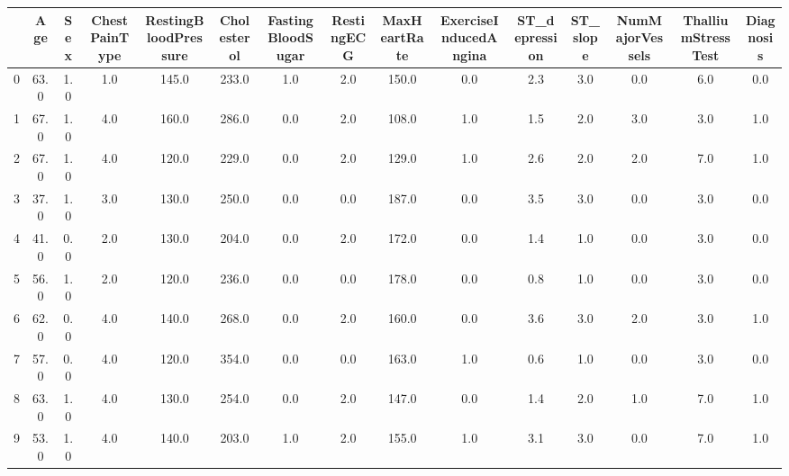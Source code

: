 \begin{tabular}{lcccccccccccccc}
\toprule
{} &   Age &  Sex &  ChestPainType &  RestingBloodPressure &  Cholesterol &  FastingBloodSugar &  RestingECG &  MaxHeartRate &  ExerciseInducedAngina &  ST\_depression &  ST\_slope &  NumMajorVessels &  ThalliumStressTest &  Diagnosis \\
\midrule
0 &  63.0 &  1.0 &            1.0 &                 145.0 &        233.0 &                1.0 &         2.0 &         150.0 &                    0.0 &            2.3 &       3.0 &              0.0 &                 6.0 &        0.0 \\
1 &  67.0 &  1.0 &            4.0 &                 160.0 &        286.0 &                0.0 &         2.0 &         108.0 &                    1.0 &            1.5 &       2.0 &              3.0 &                 3.0 &        1.0 \\
2 &  67.0 &  1.0 &            4.0 &                 120.0 &        229.0 &                0.0 &         2.0 &         129.0 &                    1.0 &            2.6 &       2.0 &              2.0 &                 7.0 &        1.0 \\
3 &  37.0 &  1.0 &            3.0 &                 130.0 &        250.0 &                0.0 &         0.0 &         187.0 &                    0.0 &            3.5 &       3.0 &              0.0 &                 3.0 &        0.0 \\
4 &  41.0 &  0.0 &            2.0 &                 130.0 &        204.0 &                0.0 &         2.0 &         172.0 &                    0.0 &            1.4 &       1.0 &              0.0 &                 3.0 &        0.0 \\
5 &  56.0 &  1.0 &            2.0 &                 120.0 &        236.0 &                0.0 &         0.0 &         178.0 &                    0.0 &            0.8 &       1.0 &              0.0 &                 3.0 &        0.0 \\
6 &  62.0 &  0.0 &            4.0 &                 140.0 &        268.0 &                0.0 &         2.0 &         160.0 &                    0.0 &            3.6 &       3.0 &              2.0 &                 3.0 &        1.0 \\
7 &  57.0 &  0.0 &            4.0 &                 120.0 &        354.0 &                0.0 &         0.0 &         163.0 &                    1.0 &            0.6 &       1.0 &              0.0 &                 3.0 &        0.0 \\
8 &  63.0 &  1.0 &            4.0 &                 130.0 &        254.0 &                0.0 &         2.0 &         147.0 &                    0.0 &            1.4 &       2.0 &              1.0 &                 7.0 &        1.0 \\
9 &  53.0 &  1.0 &            4.0 &                 140.0 &        203.0 &                1.0 &         2.0 &         155.0 &                    1.0 &            3.1 &       3.0 &              0.0 &                 7.0 &        1.0 \\
\bottomrule
\end{tabular}
